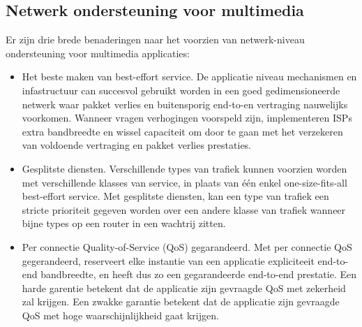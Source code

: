 \subsection{Netwerk ondersteuning voor multimedia}

Er zijn drie brede benaderingen naar het voorzien van netwerk-niveau ondersteuning voor multimedia applicaties:
\begin{itemize}
    
\item	Het beste maken van best-effort service. De applicatie niveau mechanismen en infastructuur can succesvol gebruikt worden in een goed gedimensioneerde netwerk waar pakket verlies en buitensporig end-to-en vertraging nauwelijks voorkomen. Wanneer vragen verhogingen voorspeld zijn, implementeren ISPs extra bandbreedte en wissel capaciteit om door te gaan met het verzekeren van voldoende vertraging en pakket verlies prestaties.
\item	Gesplitste diensten. Verschillende types van trafiek kunnen voorzien worden met verschillende klasses van service, in plaats van één enkel one-size-fits-all best-effort service. Met gesplitste diensten, kan een type van trafiek een stricte prioriteit gegeven worden over een andere klasse van trafiek wanneer bijne types op een router in een wachtrij zitten.
\item	Per connectie Quality-of-Service (QoS) gegarandeerd. Met per connectie QoS gegerandeerd, reserveert elke instantie van een applicatie expliciteeit end-to-end bandbreedte, en heeft dus zo een gegarandeerde end-to-end prestatie. Een harde garentie betekent dat de applicatie zijn gevraagde QoS met zekerheid zal krijgen. Een zwakke garantie betekent dat de applicatie zijn gevraagde QoS met hoge waarschijnlijkheid gaat krijgen.
\end{itemize}

\clearpage


